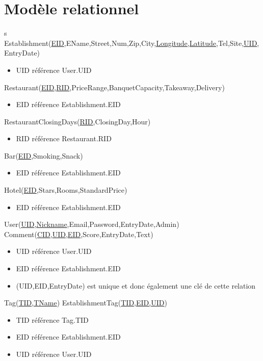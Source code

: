 \documentclass[11pt,a4paper]{report}
\begin{document}
\section*{Modèle relationnel}
s\newline
Establishment(\underline{EID},EName,Street,Num,Zip,City,\underline{Longitude,Latitude},Tel,Site,\underline{UID},EntryDate)
\begin{itemize}
\item UID référence User.UID
\end{itemize}
Restaurant(\underline{EID},\underline{RID},PriceRange,BanquetCapacity,Takeaway,Delivery)
\begin{itemize}
\item EID référence Establishment.EID
\end{itemize} 
RestaurantClosingDays(\underline{RID},ClosingDay,Hour)
\begin{itemize}
\item RID référence Restaurant.RID
\end{itemize}
Bar(\underline{EID},Smoking,Snack)
\begin{itemize}
\item EID référence Establishment.EID
\end{itemize}
Hotel(\underline{EID},Stars,Rooms,StandardPrice)
\begin{itemize}
\item EID référence Establishment.EID
\end{itemize}
User(\underline{UID},\underline{Nickname},Email,Password,EntryDate,Admin)\newline
%
Comment(\underline{CID},\underline{UID},\underline{EID},Score,EntryDate,Text)
\begin{itemize}
\item UID référence User.UID
\item EID référence Establishment.EID
\item (UID,EID,EntryDate) est unique et donc également une clé de cette relation
\end{itemize}
Tag(\underline{TID},\underline{TName})\newline
EstablishmentTag(\underline{TID,EID,UID})
\begin{itemize}
\item TID référence Tag.TID
\item EID référence Establishment.EID
\item UID référence User.UID
\end{itemize}
\end{document}
